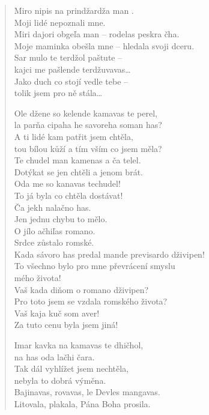 \begin{verse}
\medskip

Miro nipis na prindžardža man . \\
Moji lidé nepoznali mne. \\
Miri dajori obgeľa man -- rodelas peskra čha. \\
Moje maminka obešla mne -- hledala svoji dceru. \\
Sar mulo te terdžol paštute -- \\ 
\hspace{\fill}kajci me pašlende terdžuvavas\ldots \\
Jako duch co stojí vedle tebe -- \\
\hspace{\fill}tolik jsem pro ně stála\ldots

\medskip

Ole džene so kelende kamavas te perel, \\
\hspace{\fill}la parňa cipaha he savoreha soman has? \\
A ti lidé kam patřit jsem chtěla, \\
\hspace{\fill}tou bílou kůží a tím vším co jsem měla? \\
Te chudel man kamenas a ča telel. \\
Dotýkat se jen chtěli a jenom brát. \\
Oda me so kanavas techudel! \\
To já byla co chtěla dostávat! \\
Ča jekh nalačno has. \\
Jen jednu chybu to mělo. \\
O jílo ačhiľas romano. \\
Srdce zůstalo romské. \\
Kada sávoro has predal mande previsardo dživipen! \\
To všechno bylo pro mne převrácení smyslu \\
\hspace{\fill}mého života! \\
Vaš kada diňom  o romano dživipen? \\
Pro toto jsem se vzdala romského života? \\
Vaš kaja kuč som aver! \\
Za tuto cenu byla jsem jiná!

\medskip

Imar kavka na kamavas te dhičhol, \\
\hspace{\fill}na has oda lačhi čara. \\
Tak dál vyhlížet  jsem nechtěla, \\
\hspace{\fill}nebyla to dobrá výměna. \\
Bajinavas, rovavas, le Devles mangavas. \\
Litovala, plakala, Pána Boha prosila.


\end{verse}
